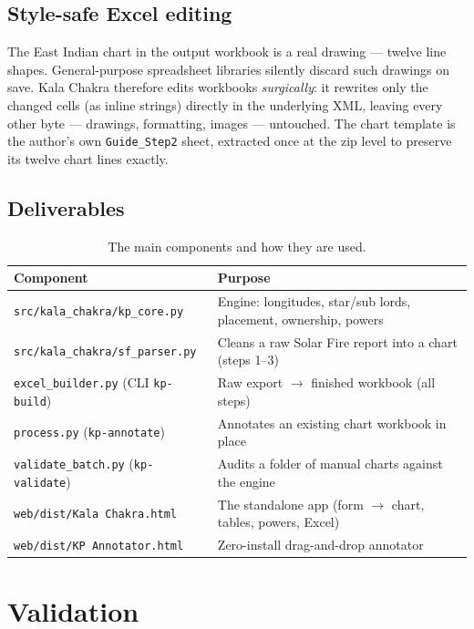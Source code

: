 \documentclass[11pt, a4paper]{article}
\newcommand{\code}[1]{\texttt{#1}}
\begin{document}
\subsection{Style-safe Excel editing}

The East Indian chart in the output workbook is a real drawing --- twelve line
shapes. General-purpose spreadsheet libraries silently discard such drawings on
save. Kala Chakra therefore edits workbooks \emph{surgically}: it rewrites only
the changed cells (as inline strings) directly in the underlying XML, leaving
every other byte --- drawings, formatting, images --- untouched. The chart
template is the author's own \code{Guide\_Step2} sheet, extracted once at the
zip level to preserve its twelve chart lines exactly.

\subsection{Deliverables}

\begin{table}[htbp]
  \centering
  \caption{The main components and how they are used.}
  \label{tab:components}
  \begin{tabularx}{\textwidth}{l X}
    \toprule
    Component & Purpose \\
    \midrule
    \code{src/kala\_chakra/kp\_core.py} & Engine: longitudes, star/sub lords, placement, ownership, powers \\
    \code{src/kala\_chakra/sf\_parser.py} & Cleans a raw Solar Fire report into a chart (steps 1--3) \\
    \code{excel\_builder.py} (CLI \code{kp-build}) & Raw export $\to$ finished workbook (all steps) \\
    \code{process.py} (\code{kp-annotate}) & Annotates an existing chart workbook in place \\
    \code{validate\_batch.py} (\code{kp-validate}) & Audits a folder of manual charts against the engine \\
    \code{web/dist/Kala Chakra.html} & The standalone app (form $\to$ chart, tables, powers, Excel) \\
    \code{web/dist/KP Annotator.html} & Zero-install drag-and-drop annotator \\
    \bottomrule
  \end{tabularx}
\end{table}

\section{Validation}
\label{sec:validation}
\end{document}
